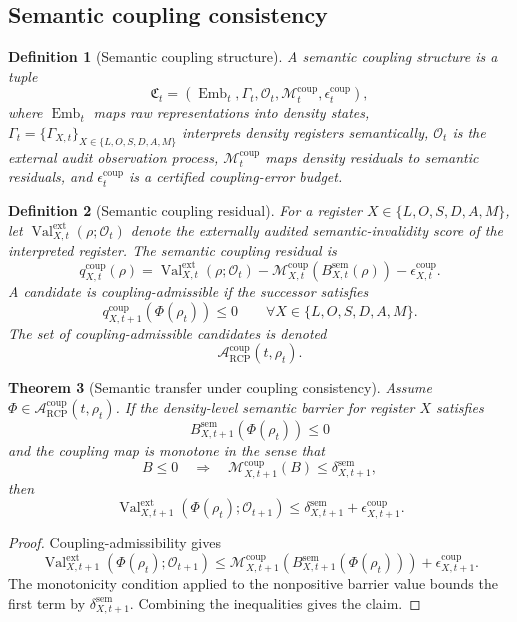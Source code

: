 \documentclass[11pt]{article}
\newtheorem{theorem}{Theorem}[section]
\newtheorem{definition}[theorem]{Definition}
\newcommand{\Acal}{\mathcal{A}}
\newcommand{\1}{\mathbf{1}}
\newcommand{\RCP}{\mathrm{RCP}}
\newcommand{\Val}{\operatorname{Val}}
\providecommand{\Mcal}{\mathcal{M}}
\providecommand{\sem}{\mathrm{sem}}
\providecommand{\Ocal}{\mathcal{O}}
\providecommand{\Embed}{\operatorname{Emb}}
\begin{document}
\subsection{Semantic coupling consistency}

\begin{definition}[Semantic coupling structure]
\label{def:semantic_coupling_structure}
A semantic coupling structure is a tuple
\[
\mathfrak C_t=(\Embed_t,\Gamma_t,\Ocal_t,\Mcal_t^{\mathrm{coup}},\epsilon_t^{\mathrm{coup}}),
\]
where \(\Embed_t\) maps raw representations into density states, \(\Gamma_t=\{\Gamma_{X,t}\}_{X\in\{L,O,S,D,A,M\}}\) interprets density registers semantically, \(\Ocal_t\) is the external audit observation process, \(\Mcal_t^{\mathrm{coup}}\) maps density residuals to semantic residuals, and \(\epsilon_t^{\mathrm{coup}}\) is a certified coupling-error budget.
\end{definition}

\begin{definition}[Semantic coupling residual]
\label{def:semantic_coupling_residual}
For a register \(X\in\{L,O,S,D,A,M\}\), let \(\Val_{X,t}^{\mathrm{ext}}(\rho;\Ocal_t)\) denote the externally audited semantic-invalidity score of the interpreted register.  The semantic coupling residual is
\[
q_{X,t}^{\mathrm{coup}}(\rho)
=
\Val_{X,t}^{\mathrm{ext}}(\rho;\Ocal_t)
-
\Mcal_{X,t}^{\mathrm{coup}}(B_{X,t}^{\sem}(\rho))
-
\epsilon_{X,t}^{\mathrm{coup}}.
\]
A candidate is coupling-admissible if the successor satisfies
\[
q_{X,t+1}^{\mathrm{coup}}(\Phi(\rho_t))
\le0
\qquad
\forall X\in\{L,O,S,D,A,M\}.
\]
The set of coupling-admissible candidates is denoted
\[
\Acal_{\RCP}^{\mathrm{coup}}(t,\rho_t).
\]
\end{definition}

\begin{theorem}[Semantic transfer under coupling consistency]
\label{thm:semantic_transfer_coupling_consistency}
Assume \(\Phi\in\Acal_{\RCP}^{\mathrm{coup}}(t,\rho_t)\).  If the density-level semantic barrier for register \(X\) satisfies
\[
B_{X,t+1}^{\sem}(\Phi(\rho_t))\le0
\]
and the coupling map is monotone in the sense that
\[
B\le0\quad\Longrightarrow\quad \Mcal_{X,t+1}^{\mathrm{coup}}(B)\le \delta_{X,t+1}^{\sem},
\]
then
\[
\Val_{X,t+1}^{\mathrm{ext}}(\Phi(\rho_t);\Ocal_{t+1})
\le
\delta_{X,t+1}^{\sem}+\epsilon_{X,t+1}^{\mathrm{coup}}.
\]
\end{theorem}

\begin{proof}
Coupling-admissibility gives
\[
\Val_{X,t+1}^{\mathrm{ext}}(\Phi(\rho_t);\Ocal_{t+1})
\le
\Mcal_{X,t+1}^{\mathrm{coup}}(B_{X,t+1}^{\sem}(\Phi(\rho_t)))
+
\epsilon_{X,t+1}^{\mathrm{coup}}.
\]
The monotonicity condition applied to the nonpositive barrier value bounds the first term by \(\delta_{X,t+1}^{\sem}\).  Combining the inequalities gives the claim.
\end{proof}
\end{document}
